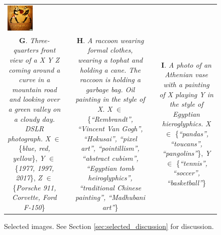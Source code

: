 \begin{figure}[ht!]
\begin{adjustwidth}{-0.8in}{-0.5in}
\begin{tabular}{cccccccccccccccccccc}
\multicolumn{2}{c}{\includegraphics[width=\threebythreecolwidth\textwidth]{figures/cherries/panda_basketball.jpg}}\\

\multicolumn{6}{p{\thirdcolwidth\textwidth}}{{\tiny \textbf{G}. \textit{Three-quarters front view of a X Y Z coming around a curve in a mountain road and looking over a green valley on a cloudy day. DSLR photograph.} \textit{X} $\in$ \{\textit{blue, red, yellow}\}, \textit{Y} $\in$ \{\textit{1977, 1997, 2017}\}, \textit{Z} $\in$ \{\textit{Porsche 911, Corvette, Ford F-150}\}}} &&
\multicolumn{6}{p{\thirdcolwidth\textwidth}}{{\tiny \textbf{H}. \textit{A raccoon wearing formal clothes, wearing a tophat and holding a cane. The raccoon is holding a garbage bag. Oil painting in the style of X.} \textit{X} $\in$ \{\textit{``Rembrandt'', ``Vincent Van Gogh'', ``Hokusai'', ``pixel art'', ``pointillism'', ``abstract cubism'', ``Egyptian tomb heiroglyphics'', ``traditional Chinese painting'', ``Madhubani art''}\}}} &&
\multicolumn{6}{p{\thirdcolwidth\textwidth}}{{\tiny \textbf{I}. \textit{A photo of an Athenian vase with a painting of X playing Y in the style of Egyptian hieroglyphics.} \textit{X} $\in$ \{\textit{``pandas'', ``toucans'', ``pangolins''}\}, \textit{Y} $\in$ \{\textit{``tennis'', ``soccer'', ``basketball''}\}}} \\
\end{tabular}
\end{adjustwidth}
\caption{Selected \bdraw images. See Section \ref{sec:selected_discussion} for discussion.}
\label{figs:cherries}
\end{figure}
